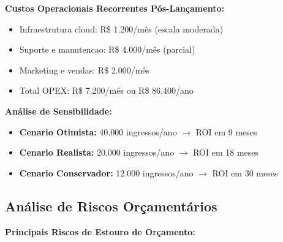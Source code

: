 \textbf{Custos Operacionais Recorrentes Pós-Lançamento:}
\begin{itemize}
    \item Infraestrutura cloud: R\$ 1.200/mês (escala moderada)
    \item Suporte e manutencao: R\$ 4.000/mês (parcial)
    \item Marketing e vendas: R\$ 2.000/mês
    \item Total OPEX: R\$ 7.200/mês ou R\$ 86.400/ano
\end{itemize}

\textbf{Análise de Sensibilidade:}
\begin{itemize}
    \item \textbf{Cenario Otimista:} 40.000 ingressos/ano \(\to\) ROI em 9 meses
    \item \textbf{Cenario Realista:} 20.000 ingressos/ano \(\to\) ROI em 18 meses
    \item \textbf{Cenario Conservador:} 12.000 ingressos/ano \(\to\) ROI em 30 meses
\end{itemize}

\subsection{Análise de Riscos Orçamentários}

\textbf{Principais Riscos de Estouro de Orçamento:}

